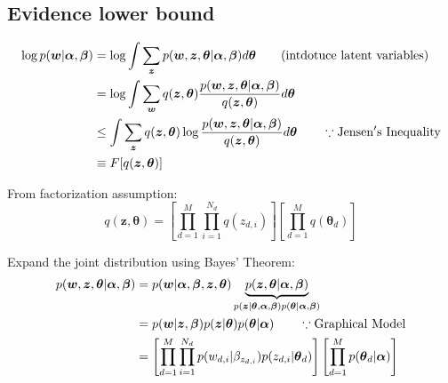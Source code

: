 \documentclass[a4paper,10.5pt,dvipdfmx]{jarticle}  %
\begin{document}
\subsection{Evidence lower bound}
\begin{align}
	\log p(\boldsymbol{w}|\boldsymbol{\alpha}, \boldsymbol{\beta}) &= \log \int \sum_{\boldsymbol{z}} p(\boldsymbol{w}, \boldsymbol{z}, \boldsymbol{\theta} | \boldsymbol{\alpha}, \boldsymbol{\beta}) d \boldsymbol{\theta} \qquad ({\rm intdotuce \ latent\ variables})\\
&=\log \int \sum_{\boldsymbol w} q(\boldsymbol{z}, \boldsymbol{\theta}) \frac{p(\boldsymbol{w}, \boldsymbol{z}, \boldsymbol{\theta} | \boldsymbol{\alpha}, \boldsymbol{\beta})}{q(\boldsymbol{z}, \boldsymbol{\theta})} d\boldsymbol{\theta}\\
&\leq \int \sum_{\boldsymbol{z}} q(\boldsymbol{z}, \boldsymbol{\theta}) \log \frac{p(\boldsymbol{w}, \boldsymbol{z}, \boldsymbol{\theta} | \boldsymbol{\alpha}, \boldsymbol{\beta})}{q(\boldsymbol{z}, \boldsymbol{\theta})} d \boldsymbol{\theta} \qquad \because {\rm Jensen's\ Inequality}\\
&\equiv F[q(\boldsymbol{z}, \boldsymbol{\theta})]
\end{align}

From factorization assumption:
\begin{equation}
	q(\boldsymbol{z}, \boldsymbol{\theta}) = \left[ \prod_{d=1}^{M} \prod_{i=1}^{N_d} q(z_{d,i}) \right] \left[ \prod_{d=1}^{M} q(\boldsymbol{\theta}_d) \right]
\end{equation}

Expand the joint distribution using Bayes' Theorem:
\begin{align}
	p(\boldsymbol{w}, \boldsymbol{z}, \boldsymbol{\theta} | \boldsymbol{\alpha}, \boldsymbol{\beta}) &= p(\boldsymbol{w}| \boldsymbol{\alpha}, \boldsymbol{\beta}, \boldsymbol{z}, \boldsymbol{\theta}) \underbrace{p(\boldsymbol{z}, \boldsymbol{\theta} | \boldsymbol{\alpha}, \boldsymbol{\beta})}_{p(\boldsymbol{z}|\boldsymbol{\theta}, \boldsymbol{\alpha}, \boldsymbol{\beta}) p(\boldsymbol{\theta} | \boldsymbol{\alpha}, \boldsymbol{\beta})} \\
&= p(\boldsymbol{w} | \boldsymbol{z}, \boldsymbol{\beta}) p(\boldsymbol{z} | \boldsymbol{\theta}) p(\boldsymbol{\theta} | \boldsymbol{\alpha})  \qquad \because {\rm Graphical\ Model}\\
&= \left[ \prod_{d=1}^{M} \prod_{i=1}^{N_d} p(w_{d,i} | \beta_{z_{d,i}}) p(z_{d,i} | \boldsymbol{\theta}_d) \right] \left[ \prod_{d=1}^{M} p(\boldsymbol{\theta}_{d} | \boldsymbol{\alpha})  \right]
\end{align}
\end{document}
